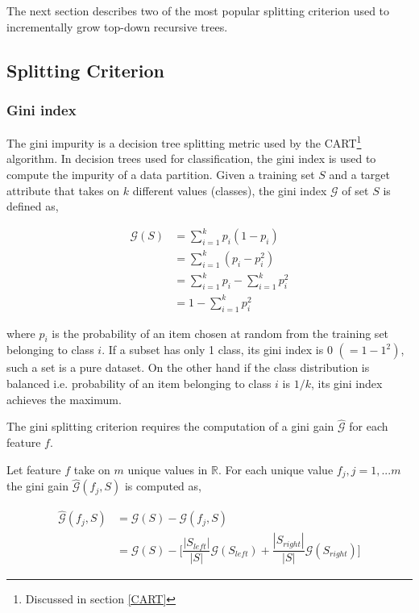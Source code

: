 \documentclass[final,3p,times,twocolumn]{elsarticle}
\begin{document}
The next section describes two of the most popular splitting criterion used to incrementally grow top-down recursive trees. 

\subsection{Splitting Criterion}
\label{split}
\subsubsection{Gini index}
The gini impurity is a decision tree splitting metric used by the CART\footnote{Discussed in section \ref{CART}} algorithm. In decision trees used for classification, the gini index is used to compute the impurity of a data partition. Given a training set $S$ and a target attribute that takes on $k$ different values (classes), the gini index $\mathcal{G}$ of set $S$ is defined as,
   
\begin{align*}
\mathcal{G}(S) &= \sum_{i=1}^{k} p_{i}(1 - p_{i})  \\
&= \sum_{i=1}^k(p_{i} - p_{i}^2) \\
&= \sum_{i=1}^k p_{i} - \sum_{i=1}^k p_{i}^2 \\
 &= 1 - \sum_{i=1}^k p_{i}^{2}  
\end{align*}

where $p_{i}$ is the probability of an item chosen at random from the training set belonging to class $i$. If a subset has only 1 class, its gini index is $0$ $(=1 - 1^{2})$, such a set is a pure dataset. On the other hand if the class distribution is balanced i.e. probability of an item belonging to class $i$ is $1/k$, its gini index achieves the maximum.

The gini splitting criterion requires the computation of a gini gain $\hat{\mathcal{G}}$ for each feature $f$. 

Let feature $f$ take on $m$ unique values in $\mathbb{R}$. For each unique value $f_{j}, j = 1,...m$ the gini gain $\hat{\mathcal{G}}(f_{j},S)$ is computed as, 

\begin{align*}
\hat{\mathcal{G}}(f_{j},S) &= \mathcal{G}(S) - \mathcal{G}(f_{j},S)  \\
&= \mathcal{G}(S) - \Bigg[ \dfrac{|S_{left}|}{|S|} \mathcal{G}(S_{left}) + \dfrac{|S_{right}|}{|S|} \mathcal{G}(S_{right}) \Bigg]
\end{align*}
 
\end{document}

